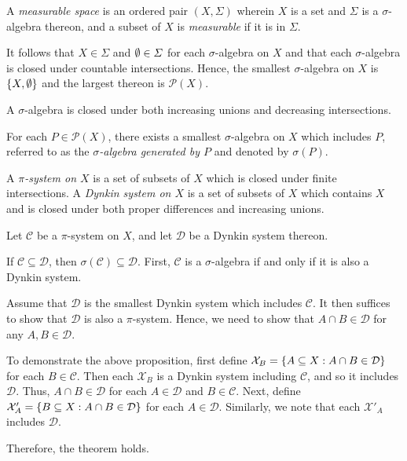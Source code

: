   A \emph{measurable space} is an ordered pair \((X, \varSigma)\) wherein \(X\) is a set and \(\varSigma\) is a
  \(\sigma\)-algebra thereon, and a subset of \(X\) is \emph{measurable} if it is in \(\varSigma\).
\Edf

It follows that \(X \in \varSigma\) and \(\emptyset \in \varSigma\) for each \(\sigma\)-algebra on \(X\) and that each
\(\sigma\)-algebra is closed under countable intersections. Hence, the smallest \(\sigma\)-algebra on \(X\) is \(\{X,
\emptyset\}\) and the largest thereon is \(\mathcal{P}(X)\).

A \(\sigma\)-algebra is closed under both increasing unions and decreasing intersections.

For each \(P \in \mathcal{P}(X)\), there exists a smallest \(\sigma\)-algebra on \(X\) which includes \(P\), referred to
as the \emph{\(\sigma\)-algebra generated by \(P\)} and denoted by \(\sigma(P)\).

A \emph{\(\pi\)-system on \(X\)} is a set of subsets of \(X\) which is closed under finite intersections. A
\emph{Dynkin system on \(X\)} is a set of subsets of \(X\) which contains \(X\) and is closed under both proper
differences and increasing unions.

  Let \(\mathcal{C}\) be a \(\pi\)-system on \(X\), and let \(\mathcal{D}\) be a Dynkin system thereon.

  If \(\mathcal{C} \subseteq \mathcal{D}\), then \(\sigma(\mathcal{C}) \subseteq \mathcal{D}\).
\Eth
\Bpr
  First, \(\mathcal{C}\) is a \(\sigma\)-algebra if and only if it is also a Dynkin system.

  Assume that \(\mathcal{D}\) is the smallest Dynkin system which includes \(\mathcal{C}\). It then suffices to show
  that \(\mathcal{D}\) is also a \(\pi\)-system. Hence, we need to show that \(A \cap B \in \mathcal{D}\) for any
  \(A, B \in \mathcal{D}\).

  To demonstrate the above proposition, first define \(\mathcal{X}_B = \{A \subseteq X : A \cap B \in \mathcal{D}\}\)
  for each \(B \in \mathcal{C}\). Then each \(\mathcal{X}_B\) is a Dynkin system including \(\mathcal{C}\), and so it
  includes \(\mathcal{D}\). Thus, \(A \cap B \in \mathcal{D}\) for each \(A \in \mathcal{D}\) and \(B \in \mathcal{C}\).
  Next, define \(\mathcal{X}'_A = \{B \subseteq X : A \cap B \in \mathcal{D}\}\) for each \(A \in \mathcal{D}\).
  Similarly, we note that each \(\mathcal{X}'_A\) includes \(\mathcal{D}\).

  Therefore, the theorem holds.
\Epr

